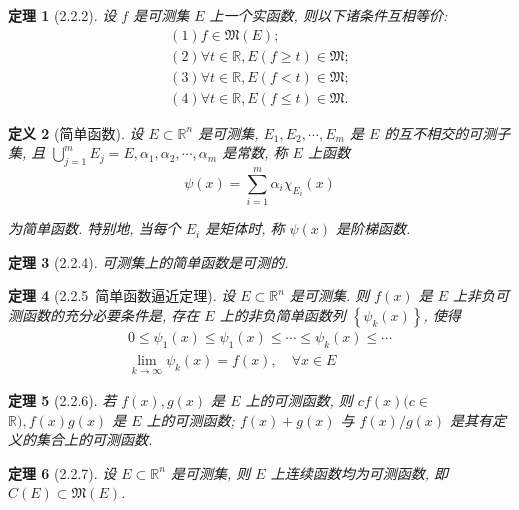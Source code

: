 \documentclass[10pt,openany]{book}
\theoremstyle{thmstyle} %
\newtheorem{theorem}{定理}[chapter]
\theoremstyle{defstyle} %
\newtheorem{definition}[theorem]{定义}
\theoremstyle{prostyle} %
\begin{document}
\begin{theorem}[2.2.2]
设 $f$ 是可测集 $E$ 上一个实函数, 则以下诸条件互相等价:
\begin{equation}
\begin{gathered}
(1) f \in \mathfrak{M}(E); \\
(2) \forall t \in \mathbb{R}, E(f \geq t) \in \mathfrak{M}; \\
(3) \forall t \in \mathbb{R}, E(f<t) \in \mathfrak{M}; \\
(4) \forall t \in \mathbb{R}, E(f \leq t) \in \mathfrak{M}. 
\end{gathered}
\end{equation}
\end{theorem}



\begin{definition}[简单函数]
设 $E \subset \mathbb{R}^n$ 是可测集, $E_1, E_2, \cdots, E_m$ 是 $E$ 的互不相交的可测子集, 且 $\bigcup_{j=1}^m E_j=E, \alpha_1, \alpha_2, \cdots, \alpha_m$ 是常数, 称 $E$ 上函数
\begin{equation}
\psi(x)=\sum_{i=1}^m \alpha_i \chi_{E_i}(x)
\end{equation}

为简单函数. 特别地, 当每个 $E_i$ 是矩体时, 称 $\psi(x)$ 是阶梯函数.
\end{definition}

\begin{theorem}[2.2.4]
可测集上的简单函数是可测的.
\end{theorem}

\begin{theorem}[2.2.5~简单函数逼近定理]
设 $E \subset \mathbb{R}^n$ 是可测集. 则 $f(x)$ 是 $E$ 上非负可测函数的充分必要条件是, 存在 $E$ 上的非负简单函数列 $\left\{\psi_k(x)\right\}$, 使得
$$
\begin{gathered}
0 \leq \psi_1(x) \leq \psi_1(x) \leq \cdots \leq \psi_k(x) \leq \cdots \\
\lim _{k \rightarrow \infty} \psi_k(x)=f(x), \quad \forall x \in E
\end{gathered}
$$
\end{theorem}

\begin{theorem}[2.2.6]
若 $f(x), g(x)$ 是 $E$ 上的可测函数, 则 $c f(x)(c \in$ $\mathbb{R}), f(x) g(x)$ 是 $E$ 上的可测函数; $f(x)+g(x)$ 与 $f(x) / g(x)$ 是其有定义的集合上的可测函数.
\end{theorem}

\begin{theorem}[2.2.7]
设 $E \subset \mathbb{R}^n$ 是可测集, 则 $E$ 上连续函数均为可测函数, 即 $C(E) \subset \mathfrak{M}(E)$.
\end{theorem}
\end{document}
